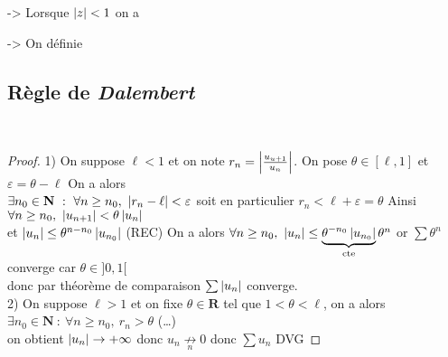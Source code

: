 
		\hspace*{2.5cm} -> Lorsque $\left\vert z \right\vert < 1$ on a 
		
		\hspace*{2.5cm} -> On définie  \medskip \\

	\subsection{Règle de \emph{Dalembert}}

		~ \medskip \\

		\begin{proof}
			{\small 1)} On suppose $\ell<1$ et on note $r_n = \left\vert \frac{u_{u+1}}{u_n} \right\vert$. On pose $\theta \in [\ell,1] $ et $\varepsilon = \theta -\ell$
			On a alors \\ $\exists n_0 \in \mathbf{N} ~:~ \forall n\geq n_0 ,~\left\vert r_n -\ell \right\vert <\varepsilon$  soit en particulier $r_n < \ell+\varepsilon 
			=\theta$ Ainsi $\forall n\geq n_0 ,~\left\vert u_{n+1} \right\vert < \theta\left\vert u_n \right\vert$ \\ et $ \left\vert u_n \right\vert \leq \theta^{n-n_0} \left\vert u_{n_0} \right\vert$ {\small (REC) }
			On a alors $\forall n\geq n_0 ,~\left\vert u_n \right\vert \leq \underbrace{\theta^{-n_0} \left\vert u_{n_0} \right\vert}_{\mathrm{cte}} \theta^n$ 
			or $\sum\theta^n$ converge car $\theta \in ]0,1[$ \\donc par théorème de comparaison $\sum \left\vert u_n \right\vert $ converge.
			\vspace*{0.2cm}\\ {\small 2)} On suppose $\ell>1$ et on fixe $\theta \in \mathbf{R}$ tel que $ 1<\theta <\ell$, 
			on a alors $\exists n_0 \in \mathbf{N} ~:~\forall n\geq n_0 ,~r_n > \theta$ (\dots)\\
			on obtient $\left\vert u_n \right\vert \to +\infty$ donc $u_n \underset{n}{\nrightarrow} 0$ donc $\sum u_n$ DVG
		\end{proof} 
		
